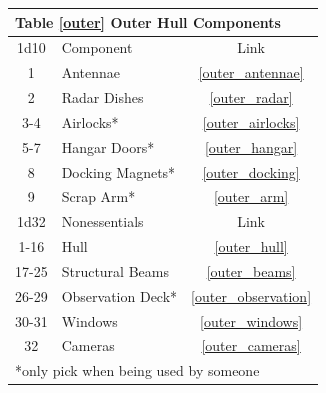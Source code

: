 \documentclass[a4paper]{article}
\begin{document}
\vspace{0.5cm} \hspace{0.25\linewidth}
\def\outer_components{
\begin{tabular}[t]{@{} | c | l | c | @{}}
\toprule
\multicolumn{3}{|l|}{Table \ref{outer} Outer Hull Components} \\
\toprule
1d10 & Component & Link \\
\midrule
1 & Antennae & \ref{outer_antennae} \\
2 & Radar Dishes & \ref{outer_radar} \\
3-4 & Airlocks* & \ref{outer_airlocks} \\
5-7 & Hangar Doors* & \ref{outer_hangar} \\
8 & Docking Magnets* & \ref{outer_docking} \\
9 & Scrap Arm* & \ref{outer_arm} \\
\midrule
1d32 & Nonessentials & Link \\
\midrule
1-16 & Hull & \ref{outer_hull} \\
17-25 & Structural Beams & \ref{outer_beams} \\
26-29 & Observation Deck* & \ref{outer_observation} \\
30-31 & Windows & \ref{outer_windows} \\ 
32 & Cameras & \ref{outer_cameras} \\
\midrule
\multicolumn{3}{|l|}{*only pick when being used by someone} \\
\bottomrule
\end{tabular}
}
\outer_components
\end{document}

